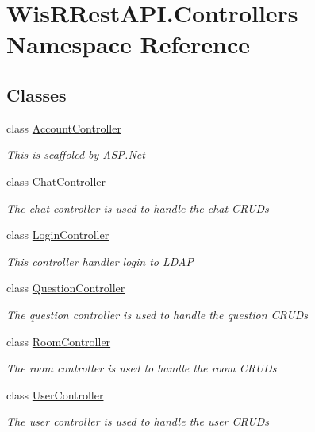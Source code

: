 \hypertarget{namespace_wis_r_rest_a_p_i_1_1_controllers}{}\section{Wis\+R\+Rest\+A\+P\+I.\+Controllers Namespace Reference}
\label{namespace_wis_r_rest_a_p_i_1_1_controllers}
\subsection*{Classes}
\begin{DoxyCompactItemize}
\item 
class \hyperlink{class_wis_r_rest_a_p_i_1_1_controllers_1_1_account_controller}{Account\+Controller}
\begin{DoxyCompactList}\small\item\em This is scaffoled by A\+S\+P.\+Net \end{DoxyCompactList}\item 
class \hyperlink{class_wis_r_rest_a_p_i_1_1_controllers_1_1_chat_controller}{Chat\+Controller}
\begin{DoxyCompactList}\small\item\em The chat controller is used to handle the chat C\+R\+U\+D\textquotesingle{}s \end{DoxyCompactList}\item 
class \hyperlink{class_wis_r_rest_a_p_i_1_1_controllers_1_1_login_controller}{Login\+Controller}
\begin{DoxyCompactList}\small\item\em This controller handler login to L\+D\+A\+P \end{DoxyCompactList}\item 
class \hyperlink{class_wis_r_rest_a_p_i_1_1_controllers_1_1_question_controller}{Question\+Controller}
\begin{DoxyCompactList}\small\item\em The question controller is used to handle the question C\+R\+U\+D\textquotesingle{}s \end{DoxyCompactList}\item 
class \hyperlink{class_wis_r_rest_a_p_i_1_1_controllers_1_1_room_controller}{Room\+Controller}
\begin{DoxyCompactList}\small\item\em The room controller is used to handle the room C\+R\+U\+D\textquotesingle{}s \end{DoxyCompactList}\item 
class \hyperlink{class_wis_r_rest_a_p_i_1_1_controllers_1_1_user_controller}{User\+Controller}
\begin{DoxyCompactList}\small\item\em The user controller is used to handle the user C\+R\+U\+D\textquotesingle{}s \end{DoxyCompactList}\end{DoxyCompactItemize}

